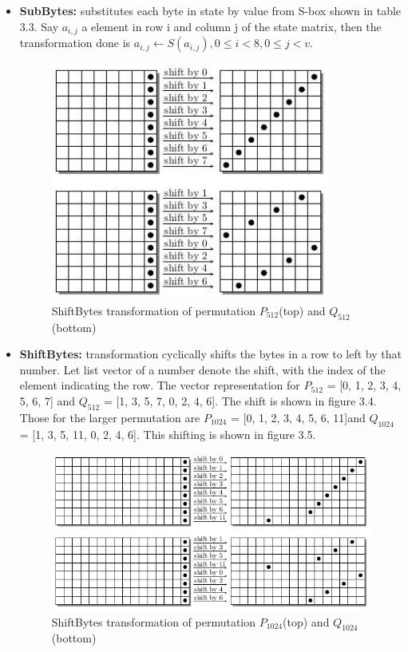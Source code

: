 \begin{itemize}
  \item {\bf SubBytes:} substitutes each byte in state by value from S-box shown in table 3.3.
  Say $a_{i,j}$ a element in row i and column j of the state matrix, then the transformation done is 
  $a_{i,j} \gets S( a_{i,j}),  0 \leq i < 8, 0 \leq j < v.$ 
  
  \begin{figure}
    \begin{center}
      \includegraphics[width=3.6in]{groestl512shift.jpg}
    \end{center}
    \caption{ShiftBytes transformation of permutation $P_{512}$(top) and $Q_{512}$(bottom) \cite{00019}}
    \label{fig:lab}
  \end{figure}

  \item {\bf ShiftBytes:} transformation cyclically shifts the bytes in a row to left by that number. Let list 
  vector of a number denote the shift, with the index of the element indicating the row. The vector representation
  for $P_{512}$ = [0, 1, 2, 3, 4, 5, 6, 7] and $Q_{512}$ = [1, 3, 5, 7, 0, 2, 4, 6]. The shift is shown in figure
  3.4. Those for the larger permutation are $P_{1024}$ = [0, 1, 2, 3, 4, 5, 6, 11]and $Q_{1024}$ = 
  [1, 3, 5, 11, 0, 2, 4, 6]. This shifting is shown in figure 3.5.
    
  \begin{figure}
    \begin{center}
      \includegraphics[width=6.4in]{groestl1024shift.jpg}
    \end{center}
    \caption{ShiftBytes transformation of permutation $P_{1024}$(top) and $Q_{1024}$(bottom) \cite{00019}}
    \label{fig:lab}
  \end{figure}


\end{itemize}
